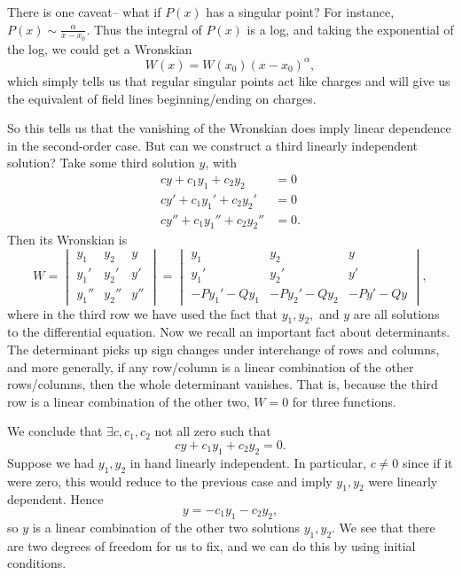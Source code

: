 There is one caveat-- what if $P(x)$ has a singular point? For instance, $P(x) \sim \frac{\alpha}{x-x_0}$. Thus the integral of $P(x)$ is a log, and taking the exponential of the log, we could get a Wronskian
\begin{equation}
    W(x) = W(x_0)(x-x_0)^\alpha,
\end{equation}
which simply tells us that regular singular points act like charges and will give us the equivalent of field lines beginning/ending on charges.

So this tells us that the vanishing of the Wronskian does imply linear dependence in the second-order case. But can we construct a third linearly independent solution? Take some third solution $y$, with
\begin{align*}
    c y + c_1 y_1 + c_2 y_2 &= 0\\
    c y' + c_1 y_1' + c_2 y_2' &= 0\\
    c y'' + c_1 y_1'' + c_2 y_2'' &= 0.
\end{align*}
Then its Wronskian is
\begin{equation}
    W= \begin{vmatrix}
    y_1 & y_2 & y\\
    y_1' & y_2' & y'\\
    y_1'' & y_2'' & y''
    \end{vmatrix} =\begin{vmatrix}
    y_1 & y_2 & y\\
    y_1' & y_2' & y'\\
    -P y_1' -Q y_1 & -Py_2' - Q y_2 & -P y' - Q y
    \end{vmatrix},
\end{equation}
where in the third row we have used the fact that $y_1,y_2,$ and $y$ are all solutions to the differential equation. Now we recall an important fact about determinants. The determinant picks up sign changes under interchange of rows and columns, and more generally, if any row/column is a linear combination of the other rows/columns, then the whole determinant vanishes. That is, because the third row is a linear combination of the other two, $W=0$ for three functions.

We conclude that $\exists c,c_1,c_2$ not all zero such that
\begin{equation}
    c y + c_1 y_1 + c_2 y_2 = 0.
\end{equation}
Suppose we had $y_1,y_2$ in hand linearly independent. In particular, $c\neq 0$ since if it were zero, this would reduce to the previous case and imply $y_1,y_2$ were linearly dependent. Hence
\begin{equation}
    y = -c_1 y_1 - c_2 y_2,
\end{equation}
so $y$ is a linear combination of the other two solutions $y_1,y_2$. We see that there are two degrees of freedom for us to fix, and we can do this by using initial conditions.

